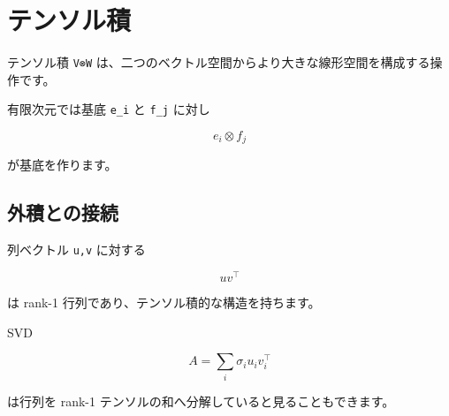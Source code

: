\documentclass[
  11pt,
  a4paper,
]{ltjsarticle}
\author{}
\date{}
\begin{document}
\hypertarget{ux30c6ux30f3ux30bdux30ebux7a4d}{%
\section{テンソル積}\label{ux30c6ux30f3ux30bdux30ebux7a4d}}

テンソル積 \texttt{V⊗W}
は、二つのベクトル空間からより大きな線形空間を構成する操作です。

有限次元では基底 \texttt{e\_i} と \texttt{f\_j} に対し

\[
e_i\otimes f_j
\]

が基底を作ります。

\hypertarget{ux5916ux7a4dux3068ux306eux63a5ux7d9a}{%
\subsection{外積との接続}\label{ux5916ux7a4dux3068ux306eux63a5ux7d9a}}

列ベクトル \texttt{u,v} に対する

\[
uv^\top
\]

は rank-1 行列であり、テンソル積的な構造を持ちます。

SVD

\[
A=\sum_i\sigma_i u_i v_i^\top
\]

は行列を rank-1 テンソルの和へ分解していると見ることもできます。
\end{document}
